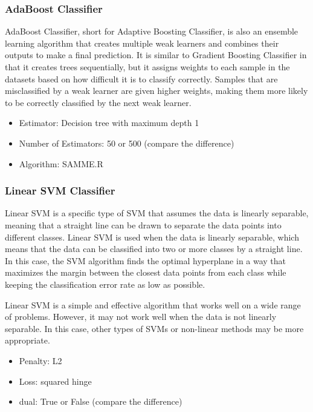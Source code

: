 \documentclass[twocolumn]{extarticle}
\begin{document}
\subsubsection{AdaBoost Classifier}

AdaBoost Classifier, short for Adaptive Boosting Classifier, is also an ensemble learning algorithm that creates multiple weak learners and combines their outputs to make a final prediction. It is similar to Gradient Boosting Classifier in that it creates trees sequentially, but it assigns weights to each sample in the datasets based on how difficult it is to classify correctly. Samples that are misclassified by a weak learner are given higher weights, making them more likely to be correctly classified by the next weak learner.

\begin{itemize}
\item Estimator: Decision tree with maximum depth 1
\item Number of Estimators: 50 or 500 (compare the difference)
\item Algorithm: SAMME.R
\end{itemize}

\subsubsection{Linear SVM Classifier}\label{sec: linear-svm}

Linear SVM is a specific type of SVM that assumes the data is linearly separable, meaning that a straight line can be drawn to separate the data points into different classes. Linear SVM is used when the data is linearly separable, which means that the data can be classified into two or more classes by a straight line. In this case, the SVM algorithm finds the optimal hyperplane in a way that maximizes the margin between the closest data points from each class while keeping the classification error rate as low as possible.

Linear SVM is a simple and effective algorithm that works well on a wide range of problems. However, it may not work well when the data is not linearly separable. In this case, other types of SVMs or non-linear methods may be more appropriate.

\begin{itemize}
\item Penalty: L2
\item Loss: squared hinge
\item dual: True or False (compare the difference)
\end{itemize}
\end{document}
